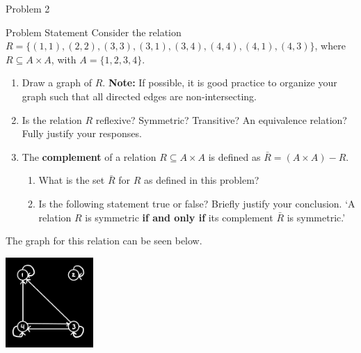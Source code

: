 \begin{problem}{Problem 2}
    \begin{statement}{Problem Statement}
        Consider the relation $R = \{(1,1),(2,2),(3,3),(3,1),(3,4),(4,4),(4,1),(4,3)\}$, where $R \subseteq A \times A$, with $A = \{1,2,3,4\}$.

        \begin{enumerate}[label = (\alph*)]
            \item Draw a graph of $R$. \textbf{Note:} If possible, it is good practice to organize your graph such that all directed edges are non-intersecting.
            \item Is the relation $R$ reflexive? Symmetric? Transitive? An equivalence relation? Fully justify your responses.
            \item The \textbf{complement} of a relation $R \subseteq A \times A$ is defined as $\bar{R} = (A \times A) - R$.
            \begin{enumerate}[label = (\arabic*)]
                \item What is the set $\bar{R}$ for $R$ as defined in this problem?
                \item Is the following statement true or false? Briefly justify your conclusion. `A relation $R$ is symmetric \textbf{if and only if} its complement $\bar{R}$ is symmetric.'
            \end{enumerate}
        \end{enumerate}
    \end{statement}

    \begin{highlight}
        The graph for this relation can be seen below.
        \begin{center}
            \includegraphics[width = 0.25\textwidth]{./Images/P2-Graph.jpg}
        \end{center}
    \end{highlight}


\end{problem}
